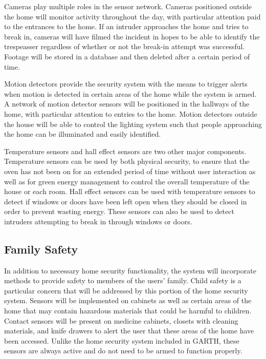 \documentclass{report}
\begin{document}
Cameras play multiple roles in the sensor network. Cameras positioned outside
the home will monitor activity throughout the day, with particular attention paid
to the entrances to the home. If an intruder approaches the home and tries to
break in, cameras will have filmed the incident in hopes to be able to identify
the trespeasser regardless of whether or not the break-in attempt was successful.
Footage will be stored in a database and then deleted after a certain period of
time.

Motion detectors provide the security system with the means to trigger alerts 
when motion is detected in certain areas of the home while the system is armed.
A network of motion detector sensors will be positioned in the hallways of the
home, with particular attention to entries to the home. Motion detectors
outside the house will be able to control the lighting system such that people
approaching the home can be illuminated and easily identified.

Temperature sensors and hall effect sensors are two other major components.
Temperature sensors can be used by both physical security, to ensure that the
oven has not been on for an extended period of time without user interaction as
well as for green energy management to control the overall temperature of the
house or each room. Hall effect sensors can be used with temperature sensors to
detect if windows or doors have been left open when they should be closed in
order to prevent wasting energy. These sensors can also be used to detect
intruders attempting to break in through windows or doors.

\subsection{Family Safety}

In addition to necessary home security functionality, the system will
incorporate methods to provide safety to members of the users' family. Child
safety is a particular concern that will be addressed by this portion of the
home security system. Sensors will be implemented on cabinets as well as
certain areas of the home that may contain hazardous materials that could be
harmful to children. Contact sensors will be present on medicine cabinets,
closets with cleaning materials, and knife drawers to alert the user that these
areas of the home have been accessed. Unlike the home security system
included in GARTH, these sensors are always active and do not need to be
armed to function properly. 
\end{document}
